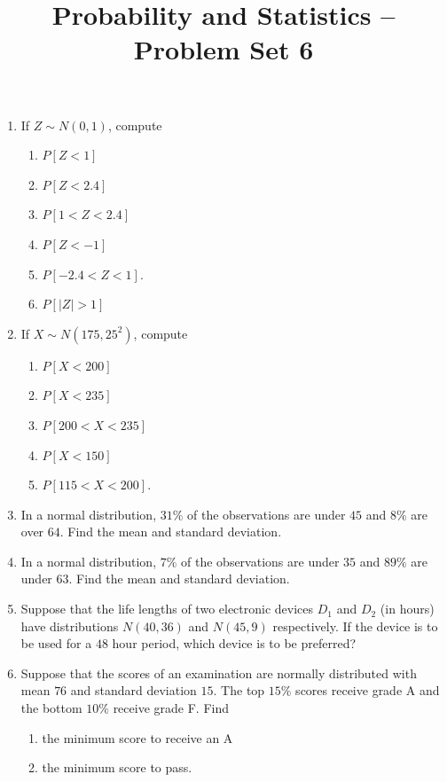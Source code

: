 \documentclass[svgnames]{amsart}
\title[]{Probability and Statistics -- Problem Set 6}
\begin{document}
\maketitle
\begin{enumerate}[leftmargin=*]
\item If $Z \sim N(0,1)$, compute
\begin{enumerate}
	\item $P[Z < 1]$
	\item $P[Z < 2.4]$
	\item $P[1 < Z < 2.4]$
	\item $P[Z < -1]$
	\item $P[-2.4 < Z < 1]$.
	\item $P[|Z| > 1]$
\end{enumerate}

\item If $X \sim N(175, 25^2)$, compute
\begin{enumerate}
	\item $P[X < 200]$
	\item $P[X < 235]$
	\item $P[200 < X < 235]$
	\item $P[X < 150]$
	\item $P[115 < X < 200]$.
\end{enumerate}

\item In a normal distribution, $31\%$ of the observations are under $45$ and $8\%$ are over $64$. Find the mean and standard deviation.

\item In a normal distribution, $7\%$ of the observations are under $35$ and $89\%$ are under $63$. Find the mean and standard deviation.

\item Suppose that the life lengths of two electronic devices $D_1$ and $D_2$ (in hours) have distributions $N(40, 36)$ and $N(45, 9)$ respectively. If the device is to be used for a $48$ hour period, which device is to be preferred?

\item Suppose that the scores of an examination are normally distributed with mean $76$ and standard deviation $15$. The top $15\%$ scores receive grade A and the bottom $10\%$ receive grade F. Find
\begin{enumerate}
	\item the minimum score to receive an A
	\item the minimum score to pass.
\end{enumerate}


\end{enumerate}
\end{document}
